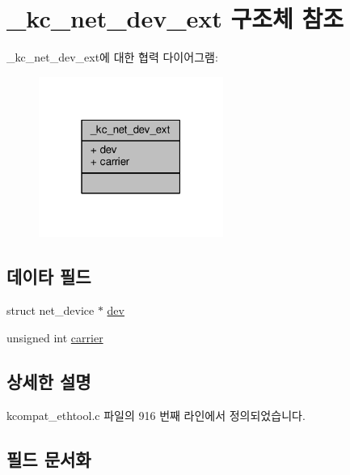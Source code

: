 \hypertarget{struct__kc__net__dev__ext}{}\section{\+\_\+kc\+\_\+net\+\_\+dev\+\_\+ext 구조체 참조}
\label{struct__kc__net__dev__ext}


\+\_\+kc\+\_\+net\+\_\+dev\+\_\+ext에 대한 협력 다이어그램\+:
\nopagebreak
\begin{figure}[H]
\begin{center}
\leavevmode
\includegraphics[width=171pt]{struct__kc__net__dev__ext__coll__graph}
\end{center}
\end{figure}
\subsection*{데이타 필드}
\begin{DoxyCompactItemize}
\item 
struct net\+\_\+device $\ast$ \hyperlink{struct__kc__net__dev__ext_abf690dbcccc005ba94a1ce16864ccdc9}{dev}
\item 
unsigned int \hyperlink{struct__kc__net__dev__ext_a71e65e92f87ac6542e37b13a98c8ebf2}{carrier}
\end{DoxyCompactItemize}


\subsection{상세한 설명}


kcompat\+\_\+ethtool.\+c 파일의 916 번째 라인에서 정의되었습니다.



\subsection{필드 문서화}
